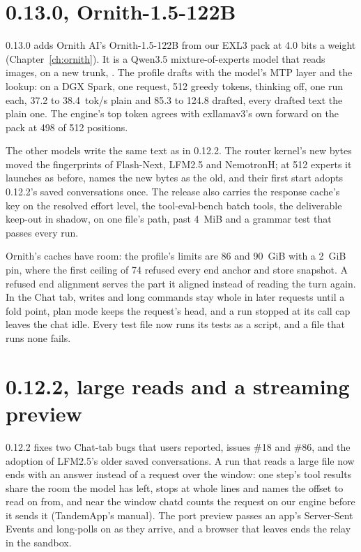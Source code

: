 \section{0.13.0, Ornith-1.5-122B}\label{sec:changelog-0130}

0.13.0 adds Ornith AI's Ornith-1.5-122B from our EXL3 pack at 4.0 bits a weight (Chapter~\ref{ch:ornith}). It is a Qwen3.5 mixture-of-experts model that reads images, on a new trunk, . The profile drafts with the model's MTP layer and the lookup: on a DGX Spark, one request, 512 greedy tokens, thinking off, one run each, 37.2 to 38.4~tok/s plain and 85.3 to 124.8 drafted, every drafted text the plain one. The engine's top token agrees with exllamav3's own forward on the pack at 498 of 512 positions.

The other models write the same text as in 0.12.2. The router kernel's new bytes moved the fingerprints of Flash-Next, LFM2.5 and NemotronH; at 512 experts it launches as before,  names the new bytes as the old, and their first start adopts 0.12.2's saved conversations once. The release also carries the response cache's key on the resolved effort level, the tool-eval-bench batch tools, the deliverable keep-out in shadow,  on one file's path,  past 4~MiB and a grammar test that passes every run.

Ornith's caches have room: the profile's limits are 86 and 90~GiB with a 2~GiB pin, where the first ceiling of 74 refused every end anchor and store snapshot. A refused end alignment serves the part it aligned instead of reading the turn again. In the Chat tab, writes and long commands stay whole in later requests until a fold point, plan mode keeps the request's head, and a run stopped at its call cap leaves the chat idle. Every test file now runs its tests as a script, and a file that runs none fails.

\section{0.12.2, large reads and a streaming preview}\label{sec:changelog-0122}

0.12.2 fixes two Chat-tab bugs that users reported, issues \#18 and \#86, and the adoption of LFM2.5's older saved conversations. A run that reads a large file now ends with an answer instead of a request over the window: one step's tool results share the room the model has left,  stops at whole lines and names the offset to read on from, and near the window chatd counts the request on our engine before it sends it (TandemApp's manual). The port preview passes an app's Server-Sent Events and long-polls on as they arrive, and a browser that leaves ends the relay in the sandbox.

